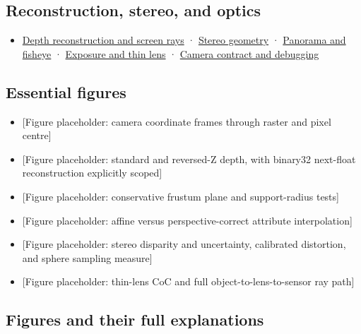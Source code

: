 \subsection{Reconstruction, stereo, and optics}\label{appendix-a2b71a18f5a2-reconstruction-stereo-and-optics}

\begin{itemize}
\tightlist
\item
  \hyperref[02-foundations-ii-ch035-recover-geometry-from-depth-and-construct-screen-space-rays]{Depth reconstruction and screen rays} · \hyperref[02-foundations-ii-ch035-build-projection-and-stereo-geometry-around-real-camera-baselines]{Stereo geometry} · \hyperref[02-foundations-ii-ch035-represent-directions-over-the-full-sphere]{Panorama and fisheye} · \hyperref[02-foundations-ii-ch036-model-exposure-physical-optics-and-depth-of-field]{Exposure and thin lens} · \hyperref[02-foundations-ii-ch037-make-camera-conventions-explicit-and-debug-the-full-transform-chain]{Camera contract and debugging}
\end{itemize}

\subsection{Essential figures}\label{appendix-a2b71a18f5a2-essential-figures}

\begin{itemize}
\tightlist
\item
  {[}Figure placeholder: camera coordinate frames through raster and pixel centre{]}
\item
  {[}Figure placeholder: standard and reversed-Z depth, with binary32 next-float reconstruction explicitly scoped{]}
\item
  {[}Figure placeholder: conservative frustum plane and support-radius tests{]}
\item
  {[}Figure placeholder: affine versus perspective-correct attribute interpolation{]}
\item
  {[}Figure placeholder: stereo disparity and uncertainty, calibrated distortion, and sphere sampling measure{]}
\item
  {[}Figure placeholder: thin-lens CoC and full object-to-lens-to-sensor ray path{]}
\end{itemize}

\subsection{Figures and their full explanations}\label{appendix-a2b71a18f5a2-figures-and-their-full-explanations}

